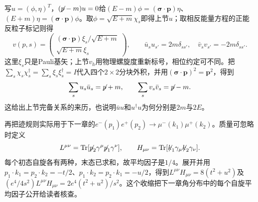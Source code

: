 写$u=(\phi,\eta)^T$，$(\slashed p-m)u=0$给$(E-m)\phi=(\boldsymbol\sigma\cdot\mathbf p)\eta$、$(E+m)\eta=(\boldsymbol\sigma\cdot\mathbf p)\phi$。取$\phi=\sqrt{E+m}\chi_s$即得上节$u$；取相反能量方程的正能反粒子标记则得
\begin{equation}
v(p,s)=\begin{pmatrix}(\boldsymbol\sigma\cdot\mathbf p)\xi_s/\sqrt{E+m}\\\sqrt{E+m}\xi_s\end{pmatrix},
\qquad \bar u_su_{s'}=2m\delta_{ss'},\quad\bar v_sv_{s'}=-2m\delta_{ss'} .
\end{equation}
这里$\xi_s$只是Pauli基矢；上节$v_h$用物理螺旋度重新标号，相位约定可不同。把$\sum_s\chi_s\chi_s^\dagger=\sum_s\xi_s\xi_s^\dagger=I$代入四个$2\times2$分块外积，并用$(\boldsymbol\sigma\cdot\mathbf p)^2=\mathbf p^2$，得到
\begin{equation}
\sum_su_s\bar u_s=\slashed p+m,\qquad\sum_sv_s\bar v_s=\slashed p-m.
\end{equation}
这给出上节完备关系的来历，也说明$\bar uu$和$u^\dagger u$为何分别是$2m$与$2E$。

再把迹规则实际用于下一章的$e^-(p_1)e^+(p_2)\to\mu^-(k_1)\mu^+(k_2)$。质量可忽略时定义
\begin{equation}
L^{\mu\nu}=\Tr[\slashed p_2\gamma^\mu\slashed p_1\gamma^\nu],\qquad
H_{\mu\nu}=\Tr[\slashed k_1\gamma_\mu\slashed k_2\gamma_\nu].
\end{equation}
每个初态自旋各有两种，末态已求和，故平均因子是$1/4$。展开并用$p_1\cdot k_1=p_2\cdot k_2=-t/2$、$p_1\cdot k_2=p_2\cdot k_1=-u/2$，得到$L^{\mu\nu}H_{\mu\nu}=8(t^2+u^2)$及
$(e^4/4s^2)L^{\mu\nu}H_{\mu\nu}=2e^4(t^2+u^2)/s^2$。这个收缩把下一章角分布中的每个自旋平均因子公开给读者核查。
